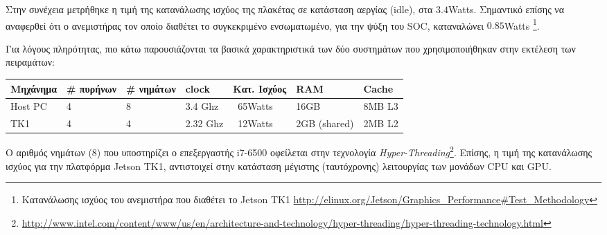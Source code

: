 Στην συνέχεια μετρήθηκε η τιμή της κατανάλωσης ισχύος της πλακέτας σε κατάσταση αεργίας (idle),
στα $3.4$Watts. Σημαντικό επίσης να αναφερθεί ότι ο ανεμιστήρας τον οποίο
διαθέτει το συγκεκριμένο ενσωματωμένο, για την ψύξη του SOC, καταναλώνει $0.85$Watts
\footnote{Κατανάλωσης ισχύος του ανεμιστήρα που διαθέτει το Jetson TK1 \url{http://elinux.org/Jetson/Graphics_Performance\#Test_Methodology}}.

Για λόγους πληρότητας, πιο κάτω παρουσιάζονται τα βασικά χαρακτηριστικά
των δύο συστημάτων που χρησιμοποιήθηκαν στην εκτέλεση των πειραμάτων:
\begin{center}
\small
\begin{tabular}{ | l | l | l | l | l | l | l | }
  \hline
  \rowcolor{Gray}
  Μηχάνημα & \# πυρήνων & \# νημάτων & clock & Κατ. Ισχύος & RAM & Cache \\
  \hline
  Host PC & 4 & 8 & 3.4 Ghz & ~65Watts & 16GB & 8MΒ L3 \\
  \hline
  TK1 & 4 & 4 & 2.32 Ghz & ~12Watts & 2GB (shared) & 2MB L2 \\
  \hline
\end{tabular}
\end{center}

Ο αριθμός νημάτων (8) που υποστηρίζει ο επεξεργαστής i7-6500 οφείλεται στην
τεχνολογία \emph{Hyper-Threading}\footnote{\url{http://www.intel.com/content/www/us/en/architecture-and-technology/hyper-threading/hyper-threading-technology.html}}.
Επίσης, η τιμή της κατανάλωσης ισχύος για την
πλατφόρμα Jetson TK1, αντιστοιχεί στην κατάσταση μέγιστης (ταυτόχρονης) λειτουργίας των μονάδων
CPU και GPU.




